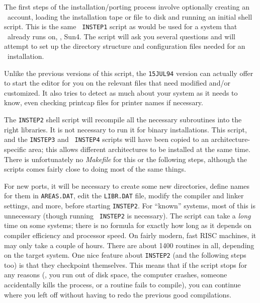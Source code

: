 The first steps of the installation/porting process involve optionally
creating an \ttaips\ account, loading the installation tape or file to
disk and running an initial shell script.  This is the same {\tt
INSTEP1} script as would be used for a system that \AIPS\ already runs on,
\eg, Sun4.  The script will ask you several questions and will attempt to
set up the directory structure and configuration files needed for an
\AIPS\ installation.

Unlike the previous versions of this script, the {\tt 15JUL94} version
can actually offer to start the editor for you on the relevant files that
need modified and/or customized.  It also tries to detect as much about
your system as it needs to know, even checking printcap files for printer
names if necessary.

\medskip{}

The {\tt INSTEP2} shell script will recompile all the necessary
subroutines into the right libraries.  It is not necessary to run it for
binary installations.  This script, and the {\tt INSTEP3} and {\tt
INSTEP4} scripts will have been copied to an architecture-specific area;
this allows different architectures to be installed at the same time.
There is unfortunately no {\it Makefile\/} for this or the following
steps, although the scripts comes fairly close to doing most of the same
things.

For new ports, it will be necessary to create some new directories, define
names for them in {\tt AREAS.DAT}, edit the {\tt LIBR.DAT} file, modify
the compiler and linker settings, and more, before starting {\tt INSTEP2}.
For ``known'' systems, most of this is unnecessary (though running {\tt
INSTEP2} is necessary).  The script can take a {\it long\/} time on some
systems; there is no formula for exactly how long as it depends on
compiler efficiency and processor speed.  On fairly modern, fast RISC
machines, it may only take a couple of hours.  There are about 1400
routines in all, depending on the target system.
One nice feature about {\tt INSTEP2} (and the following steps too) is that
they checkpoint themselves.  This means that if the script stops for any
reasons (\eg, you run out of disk space, the computer crashes, someone
accidentally kills the process, or a routine fails to compile), you can
continue where you left off without having to redo the previous good
compilations.

